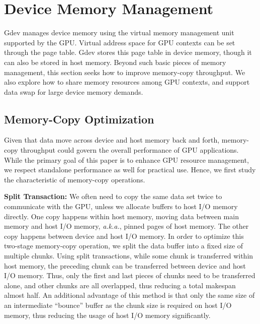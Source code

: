 \vspace{-0.25em}
\section{Device Memory Management}
\label{sec:memory_management}
\vspace{-0.25em}

Gdev manages device memory using the virtual memory management unit
supported by the GPU.
Virtual address space for GPU contexts can be set through the page
table.
Gdev stores this page table in device memory, though it can also be
stored in host memory.
Beyond such basic pieces of memory management, this section seeks how to
improve memory-copy throughput.
We also explore how to share memory resources among GPU contexts, and
support data swap for large device memory demands.

\vspace{-0.25em}
\subsection{Memory-Copy Optimization}
\label{sec:memory_copy}
\vspace{-0.25em}

Given that data move across device and host memory back and forth,
memory-copy throughput could govern the overall performance of GPU
applications.
While the primary goal of this paper is to enhance GPU resource
management, we respect standalone performance as well for practical
use.
Hence, we first study the characteristic of memory-copy operations.

\textbf{Split Transaction:}
We often need to copy the same data set twice to communicate with the
GPU, unless we allocate buffers to host I/O memory directly.
One copy happens within host memory, moving data between main memory
and host I/O memory, \textit{a.k.a.}, pinned pages of host memory.
The other copy happens between device and host I/O memory.
In order to optimize this two-stage memory-copy operation, we split the
data buffer into a fixed size of multiple chunks.
Using split transactions, while some chunk is transferred within host
memory, the preceding chunk can be transferred between device and host
I/O memory.
Thus, only the first and last pieces of chunks need to be
transferred alone, and other chunks are all overlapped, thus reducing a
total makespan almost half.
An additional advantage of this method is that only the same size of an
intermediate ``bounce'' buffer as the chunk size is required on host I/O
memory, thus reducing the usage of host I/O memory significantly.

